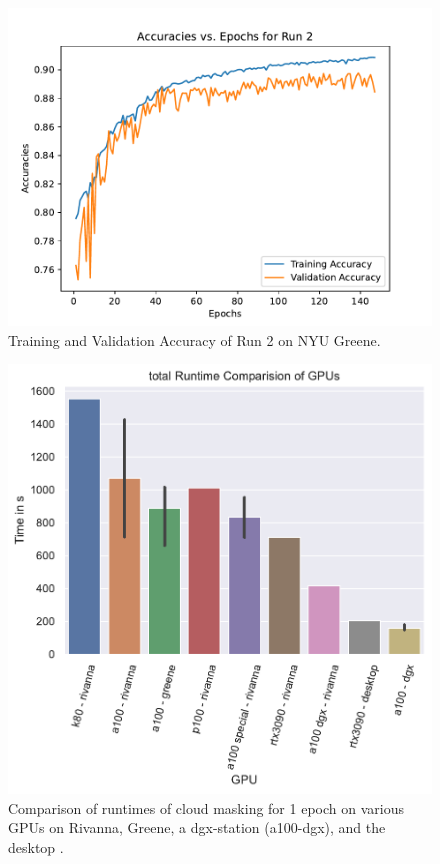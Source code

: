 \documentclass[sigplan,screen]{acmart}
\begin{document}
\begin{figure}[ht]
\centering\includegraphics[width=1.0\columnwidth]{images/epoch_vs_accuracy-2.pdf}
\caption{Training and Validation Accuracy of Run 2 on NYU Greene.}
\label{fig:Accuracies of Run 2}
\end{figure}



\begin{figure}[ht]
\centering\includegraphics[width=1.0\columnwidth]{images/gregor-epoch-1.pdf}
\caption{Comparison of runtimes of cloud masking for 1 epoch on various GPUs on Rivanna, Greene, a dgx-station (a100-dgx), and the desktop \cite{las-2023-escience-cloudmask}.}
\label{fig:epoch-compare}
\end{figure}
\end{document}
